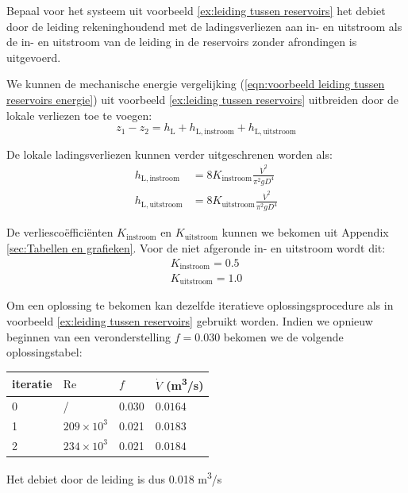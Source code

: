 \begin{voorbeeld}
\label{ex:voorbeeld leiding tussen reservoirs lokale verliezen}
Bepaal voor het systeem uit  voorbeeld \ref{ex:leiding tussen reservoirs} het debiet door de leiding rekeninghoudend met de ladingsverliezen aan in- en uitstroom als de in- en uitstroom van de leiding in de reservoirs zonder afrondingen is uitgevoerd.

We kunnen de mechanische energie vergelijking (\ref{eqn:voorbeeld leiding tussen reservoirs energie}) uit voorbeeld \ref{ex:leiding tussen reservoirs} uitbreiden door de lokale verliezen toe te voegen:
\begin{equation}
	z_1 -z_2 = h_\mathrm{L} + h_\mathrm{L,instroom} + h_\mathrm{L,uitstroom}
	\label{eqn:voorbeeld leiding tussen reservoirs lokale verliezen energie}
\end{equation}

De lokale ladingsverliezen kunnen verder uitgeschrenen worden als:
\begin{align}
	h_\mathrm{L,instroom} &= 8 K_\mathrm{instroom} \frac{\dot{V}^2}{\pi^2 g D^4} \nonumber \\
	h_\mathrm{L,uitstroom} &= 8 K_\mathrm{uitstroom} \frac{\dot{V}^2}{\pi^2 g D^4} \nonumber
\end{align}

De verliescoëfficiënten $K_\mathrm{instroom}$ en $K_\mathrm{uitstroom}$ kunnen we bekomen uit Appendix \ref{sec:Tabellen en grafieken}. Voor de niet afgeronde in- en uitstroom wordt dit:
\begin{align}
	K_\mathrm{instroom} = 0.5 \nonumber \\
	K_\mathrm{uitstroom} = 1.0 \nonumber
\end{align}

Om een oplossing te bekomen kan dezelfde iteratieve oplossingsprocedure als in voorbeeld \ref{ex:leiding tussen reservoirs} gebruikt worden. Indien we opnieuw beginnen van een veronderstelling $f=0.030$ bekomen we de volgende oplossingstabel:
\begin{center}
	\begin{tabular}{llll}
		\hline
		iteratie & $\mathrm{Re}$   & $f$   & $\dot{V}$ (\unit{m^3/s}) \\
		\hline
		0        &       /         & 0.030 &  $0.0164$ \\
		1        & $209\times10^3$ & 0.021 &  $0.0183$ \\
		2        & $234\times10^3$ & 0.021 &  $0.0184$ \\
		\hline
	\end{tabular}
\end{center}

Het debiet door de leiding is dus 0.018 \unit{m^3/s}

\end{voorbeeld}


